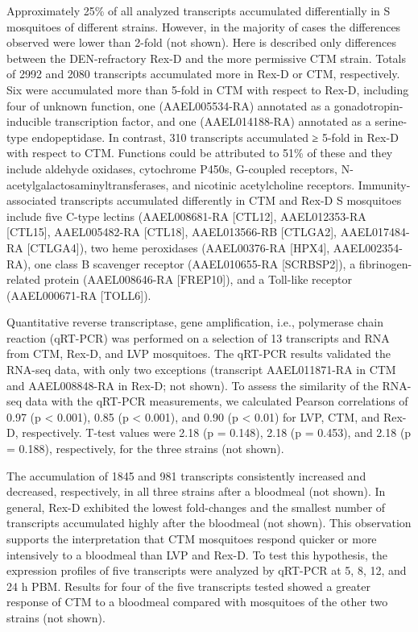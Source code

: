 Approximately 25\% of all analyzed transcripts accumulated differentially in S mosquitoes of different strains.
However, in the majority of cases the differences observed were lower than 2-fold (not shown).
Here is described only differences between the DEN-refractory \gls{Rex-D} and the more permissive \gls{CTM} strain.
Totals of 2992 and 2080 transcripts accumulated more in \gls{Rex-D} or \gls{CTM}, respectively.
Six were accumulated more than 5-fold in \gls{CTM} with respect to \gls{Rex-D}, including four of unknown function, one (AAEL005534-RA) annotated as a gonadotropin-inducible transcription factor, and one (AAEL014188-RA) annotated as a serine-type endopeptidase.
In contrast, 310 transcripts accumulated ≥ 5-fold in \gls{Rex-D} with respect to \gls{CTM}.
Functions could be attributed to 51\% of these and they include aldehyde oxidases, cytochrome P450s, G-coupled receptors, N-acetylgalactosaminyltransferases, and nicotinic acetylcholine receptors.
Immunity-associated transcripts accumulated differently in \gls{CTM} and \gls{Rex-D} S mosquitoes include five C-type lectins (AAEL008681-RA [CTL12], AAEL012353-RA [CTL15], AAEL005482-RA [CTL18], AAEL013566-RB [CTLGA2], AAEL017484-RA [CTLGA4]), two heme peroxidases (AAEL00376-RA [HPX4], AAEL002354-RA), one class B scavenger receptor (AAEL010655-RA [SCRBSP2]), a fibrinogen-related protein (AAEL008646-RA [FREP10]), and a Toll-like receptor (AAEL000671-RA [TOLL6]).


Quantitative reverse transcriptase, gene amplification, i.e., polymerase chain reaction (qRT-PCR) was performed on a selection of 13 transcripts and RNA from \gls{CTM}, \gls{Rex-D}, and \gls{LVP} mosquitoes.
The qRT-PCR results validated the RNA-seq data, with only two exceptions (transcript AAEL011871-RA in \gls{CTM} and AAEL008848-RA in \gls{Rex-D}; not shown).
To assess the similarity of the RNA-seq data with the qRT-PCR measurements, we calculated Pearson correlations of 0.97 (p < 0.001), 0.85 (p < 0.001), and 0.90 (p < 0.01) for \gls{LVP}, \gls{CTM}, and \gls{Rex-D}, respectively.
T-test values were 2.18 (p = 0.148), 2.18 (p = 0.453), and 2.18 (p = 0.188), respectively, for the three strains (not shown).

The accumulation of 1845 and 981 transcripts consistently increased and decreased, respectively, in all three strains after a bloodmeal (not shown).
In general, \gls{Rex-D} exhibited the lowest fold-changes and the smallest number of transcripts accumulated highly after the bloodmeal (not shown).
This observation supports the interpretation that \gls{CTM} mosquitoes respond quicker or more intensively to a bloodmeal than \gls{LVP} and \gls{Rex-D}.
To test this hypothesis, the expression profiles of five transcripts were analyzed by qRT-PCR at 5, 8, 12, and 24 h \gls{PBM}.
Results for four of the five transcripts tested showed a greater response of \gls{CTM} to a bloodmeal compared with mosquitoes of the other two strains (not shown).




